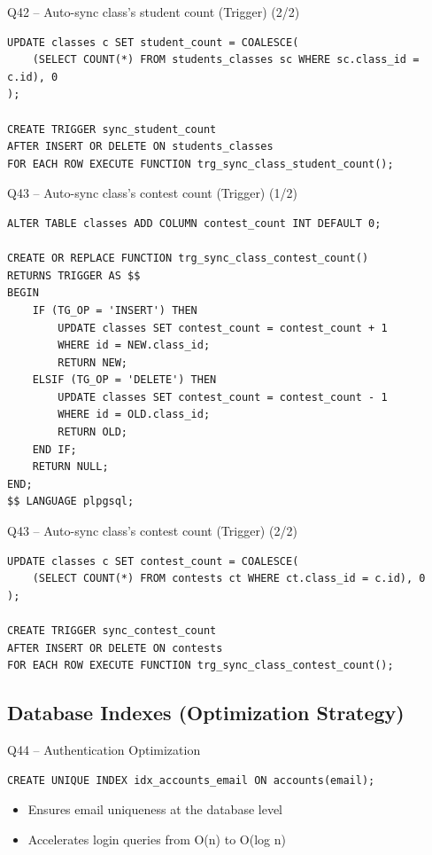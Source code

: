 \documentclass[aspectratio=169, 10pt]{beamer}
\begin{document}
\begin{frame}[fragile]{Q42 -- Auto-sync class's student count (Trigger) (2/2)}
\begin{lstlisting}
UPDATE classes c SET student_count = COALESCE(
    (SELECT COUNT(*) FROM students_classes sc WHERE sc.class_id = c.id), 0
);

CREATE TRIGGER sync_student_count
AFTER INSERT OR DELETE ON students_classes
FOR EACH ROW EXECUTE FUNCTION trg_sync_class_student_count();
\end{lstlisting}
\end{frame}


\begin{frame}[fragile]{Q43 -- Auto-sync class's contest count (Trigger) (1/2)}
    \begin{lstlisting}
ALTER TABLE classes ADD COLUMN contest_count INT DEFAULT 0;

CREATE OR REPLACE FUNCTION trg_sync_class_contest_count()
RETURNS TRIGGER AS $$
BEGIN
    IF (TG_OP = 'INSERT') THEN
        UPDATE classes SET contest_count = contest_count + 1 
        WHERE id = NEW.class_id;
        RETURN NEW;
    ELSIF (TG_OP = 'DELETE') THEN
        UPDATE classes SET contest_count = contest_count - 1 
        WHERE id = OLD.class_id;
        RETURN OLD;
    END IF;
    RETURN NULL;
END;
$$ LANGUAGE plpgsql;
\end{lstlisting}
\end{frame}


\begin{frame}[fragile]{Q43 -- Auto-sync class's contest count (Trigger) (2/2)}
\begin{lstlisting}
UPDATE classes c SET contest_count = COALESCE(
    (SELECT COUNT(*) FROM contests ct WHERE ct.class_id = c.id), 0
);

CREATE TRIGGER sync_contest_count
AFTER INSERT OR DELETE ON contests
FOR EACH ROW EXECUTE FUNCTION trg_sync_class_contest_count();
\end{lstlisting}
\end{frame}


\subsection{Database Indexes (Optimization Strategy)}

\begin{frame}[fragile]{Q44 -- Authentication Optimization}
    \begin{lstlisting}
CREATE UNIQUE INDEX idx_accounts_email ON accounts(email);
    \end{lstlisting}
    \vspace{0.3cm}
    \begin{itemize}
        \item Ensures email uniqueness at the database level
        \item Accelerates login queries from O(n) to O(log n)
    \end{itemize}
\end{frame}
\end{document}
